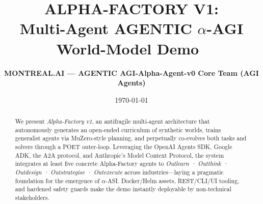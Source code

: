 \usepackage{amsmath,amsfonts,amssymb,amsthm,bm,physics}
\usepackage[dvipsnames]{xcolor}
\usepackage{graphicx,tikz,pgfplots}
  \pgfplotsset{compat=1.18}
  \usetikzlibrary{positioning,calc}
\usepackage{minted}                 %


\usepackage{hyperref}
  \hypersetup{colorlinks,allcolors=RoyalBlue}

\usepackage{booktabs,multirow}
\usepackage[inline]{enumitem}                       %
\usepackage{caption}
  \captionsetup{labelfont=bf}

\usepackage{algorithm}
\usepackage{algpseudocode}

\usepackage[
  backend=biber,
  style=authoryear,
  maxbibnames=3,
  sorting=nyt
]{biblatex}
  

\newtheorem{theorem}{Theorem}[section]
\newtheorem{lemma}{Lemma}[section]

\title{\bfseries ALPHA-FACTORY V1:\\
  Multi-Agent AGENTIC \boldmath$\alpha$-AGI World-Model Demo
  \texorpdfstring{\,}{}}
\author{\textbf{MONTREAL.AI — AGENTIC AGI-Alpha-Agent-v0 Core Team (AGI Agents)}}
\date{\today}


\maketitle

\begin{abstract}\noindent
We present \emph{Alpha-Factory v1}, an antifragile multi-agent architecture
that autonomously generates an open-ended curriculum of synthetic worlds,
trains generalist agents via MuZero-style planning, and perpetually co-evolves
both tasks and solvers through a POET outer-loop.  Leveraging the OpenAI
Agents SDK, Google ADK, the \textsc{A2A} protocol, and Anthropic’s Model
Context Protocol, the system integrates at least five concrete Alpha-Factory
agents to \emph{Outlearn · Outthink · Outdesign · Outstrategise · Outexecute}
across industries—laying a pragmatic foundation for the emergence of
$\alpha$-ASI.  Docker/Helm assets, REST/CLI/UI tooling, and hardened safety
guards make the demo instantly deployable by non-technical stakeholders.
\end{abstract}

